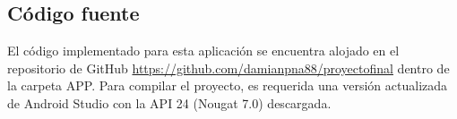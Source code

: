             
    \subsection{Código fuente}
    \par El código implementado para esta aplicación se encuentra alojado en el repositorio de GitHub \url{https://github.com/damianpna88/proyectofinal} dentro de la carpeta APP. Para compilar el proyecto, es requerida una versión actualizada de Android Studio con la API 24 (Nougat 7.0) descargada.